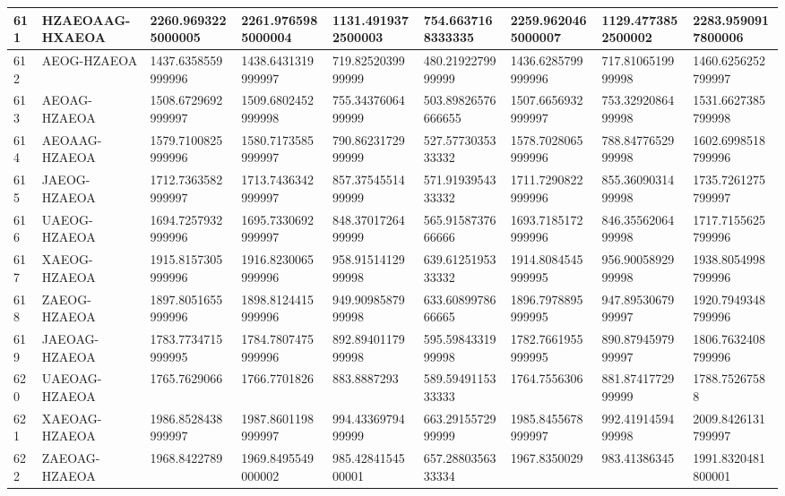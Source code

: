 {\begin{longtable}{|l|l|l|l|l|l|l|l|l|}
        611 & HZAEOAAG-HXAEOA & 2260.9693225000005 & 2261.9765985000004 & 1131.4919372500003 & 754.6637168333335 & 2259.9620465000007 & 1129.4773852500002 & 2283.9590917800006 \\ \hline
        612 & AEOG-HZAEOA & 1437.6358559999996 & 1438.6431319999997 & 719.8252039999999 & 480.2192279999999 & 1436.6285799999996 & 717.8106519999998 & 1460.6256252799997 \\ \hline
        613 & AEOAG-HZAEOA & 1508.6729692999997 & 1509.6802452999998 & 755.3437606499999 & 503.89826576666655 & 1507.6656932999997 & 753.3292086499998 & 1531.6627385799998 \\ \hline
        614 & AEOAAG-HZAEOA & 1579.7100825999996 & 1580.7173585999997 & 790.8623172999999 & 527.5773035333332 & 1578.7028065999996 & 788.8477652999998 & 1602.6998518799996 \\ \hline
        615 & JAEOG-HZAEOA & 1712.7363582999997 & 1713.7436342999997 & 857.3754551499999 & 571.9193954333332 & 1711.7290822999996 & 855.3609031499998 & 1735.7261275799997 \\ \hline
        616 & UAEOG-HZAEOA & 1694.7257932999996 & 1695.7330692999997 & 848.3701726499999 & 565.9158737666666 & 1693.7185172999996 & 846.3556206499998 & 1717.7155625799996 \\ \hline
        617 & XAEOG-HZAEOA & 1915.8157305999996 & 1916.8230065999996 & 958.9151412999998 & 639.6125195333332 & 1914.8084545999995 & 956.9005892999998 & 1938.8054998799996 \\ \hline
        618 & ZAEOG-HZAEOA & 1897.8051655999996 & 1898.8124415999996 & 949.9098587999998 & 633.6089978666665 & 1896.7978895999995 & 947.8953067999997 & 1920.7949348799996 \\ \hline
        619 & JAEOAG-HZAEOA & 1783.7734715999995 & 1784.7807475999996 & 892.8940117999998 & 595.5984331999998 & 1782.7661955999995 & 890.8794597999997 & 1806.7632408799996 \\ \hline
        620 & UAEOAG-HZAEOA & 1765.7629066 & 1766.7701826 & 883.8887293 & 589.5949115333333 & 1764.7556306 & 881.8741772999999 & 1788.75267588 \\ \hline
        621 & XAEOAG-HZAEOA & 1986.8528438999997 & 1987.8601198999997 & 994.4336979499999 & 663.2915572999999 & 1985.8455678999997 & 992.4191459499998 & 2009.8426131799997 \\ \hline
        622 & ZAEOAG-HZAEOA & 1968.8422789 & 1969.8495549000002 & 985.4284154500001 & 657.2880356333334 & 1967.8350029 & 983.41386345 & 1991.8320481800001 \\ \hline

\end{longtable}}
